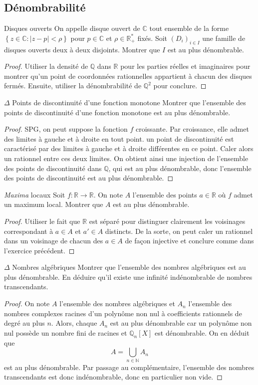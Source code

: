 \documentclass[french]{book}
\newcommand{\N}{\mathbb{N}}
\newcommand{\Q}{\mathbb{Q}}
\newcommand{\R}{\mathbb{R}}
\newcommand{\C}{\mathbb{C}}
\newcommand{\st}{^*}
\theoremstyle{plain}
\theoremstyle{definition}
\theoremstyle{remark}
\begin{document}
\subsection{Dénombrabilité}
\begin{EX}{Disques ouverts}
	On appelle disque ouvert de $\C$ tout ensemble de la forme $\left\{z \in \C : |z-p| < \rho\right\}$ pour $p\in\C$ et $\rho \in \R_+\st$ fixés. Soit $(D_i)_{i \in I}$ une famille de disques ouverts deux à deux disjoints. Montrer que $I$ est au plus dénombrable.
\end{EX}
\begin{proof}
	Utiliser la densité de $\Q$ dans $\R$ pour les parties réelles et imaginaires pour montrer qu'un point de coordonnées rationnelles appartient à chacun des disques fermés. Ensuite, utiliser la dénombrabilité de $\Q^2$ pour conclure.
\end{proof}
\begin{EX}{$\Delta$ Points de discontinuité d'une fonction monotone}
	Montrer que l'ensemble des points de discontinuité d'une fonction monotone est au plus dénombrable.
\end{EX}
\begin{proof}
	SPG, on peut suppose la fonction $f$ croissante. Par croissance, elle admet des limites à gauche et à droite en tout point. un point de discontinuité est caractérisé par des limites à gauche et à droite différentes en ce point. Caler alors un rationnel entre ces deux limites. On obtient ainsi une injection de l'ensemble des points de discontinuité dans $\Q$, qui est au plus dénombrable, donc l'ensemble des points de discontinuité est au plus dénombrable.
\end{proof}
\begin{EX}{\textit{Maxima} locaux}
	Soit $f:\R\to\R$. On note $A$ l'ensemble des points $a\in\R$ où $f$ admet un maximum local. Montrer que $A$ est au plus dénombrable.
\end{EX}
\begin{proof}
	Utiliser le fait que $\R$ est séparé pour distinguer clairement les voisinages correspondant à $a\in A$ et $a'\in A$ distincts. De la sorte, on peut caler un rationnel dans un voisinage de chacun des $a\in A$ de façon injective et conclure comme dans l'exercice précédent.
\end{proof}
\begin{EX}{$\Delta$ Nombres algébriques}
	Montrer que l'ensemble des nombres algébriques est au plus dénombrable. En déduire qu'il existe une infinité indénombrable de nombres transcendants.
\end{EX}
\begin{proof}
	On note $A$ l'ensemble des nombres algébriques et $A_n$ l'ensemble des nombres complexes racines d'un polynôme non nul à coefficients rationnels de degré au plus $n$. Alors, chaque $A_n$ est au plus dénombrable car un polynôme non nul possède un nombre fini de racines et $\Q_n[X]$ est dénombrable. On en déduit que $$A=\bigcup_{n\in\N}A_n$$ est au plus dénombrable. Par passage au complémentaire, l'ensemble des nombres transcendants est donc indénombrable, donc en particulier non vide.
\end{proof}
\end{document}
